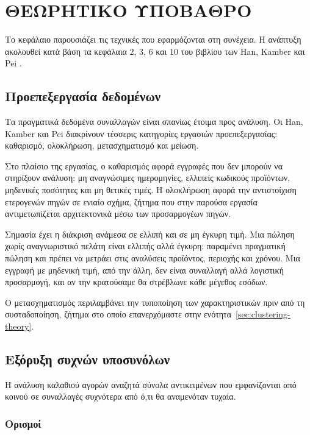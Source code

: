 \chapter{ΘΕΩΡΗΤΙΚΟ ΥΠΟΒΑΘΡΟ}
\label{chap:background}

Το κεφάλαιο παρουσιάζει τις τεχνικές που εφαρμόζονται στη συνέχεια. Η ανάπτυξη
ακολουθεί κατά βάση τα κεφάλαια 2, 3, 6 και 10 του βιβλίου των
Han, Kamber και Pei \cite{han2011data}.

\section{Προεπεξεργασία δεδομένων}

Τα πραγματικά δεδομένα συναλλαγών είναι σπανίως έτοιμα προς ανάλυση. Οι
Han, Kamber και Pei \cite{han2011data} διακρίνουν τέσσερις κατηγορίες εργασιών
προεπεξεργασίας: καθαρισμό, ολοκλήρωση, μετασχηματισμό και μείωση.

Στο πλαίσιο της εργασίας, ο καθαρισμός αφορά εγγραφές που δεν μπορούν να
στηρίξουν ανάλυση: μη αναγνώσιμες ημερομηνίες, ελλιπείς κωδικούς προϊόντων,
μηδενικές ποσότητες και μη θετικές τιμές. Η ολοκλήρωση αφορά την αντιστοίχιση
ετερογενών πηγών σε ενιαίο σχήμα, ζήτημα που στην παρούσα εργασία
αντιμετωπίζεται αρχιτεκτονικά μέσω των προσαρμογέων πηγών.

Σημασία έχει η διάκριση ανάμεσα σε ελλιπή και σε μη έγκυρη τιμή. Μια πώληση
χωρίς αναγνωριστικό πελάτη είναι ελλιπής αλλά έγκυρη: παραμένει πραγματική
πώληση και πρέπει να μετράει στις αναλύσεις προϊόντος, περιοχής και χρόνου. Μια
εγγραφή με μηδενική τιμή, από την άλλη, δεν είναι συναλλαγή αλλά λογιστική
προσαρμογή, και αν την κρατούσαμε θα στρέβλωνε κάθε μέγεθος εσόδων.

Ο μετασχηματισμός περιλαμβάνει την τυποποίηση των χαρακτηριστικών πριν από τη
συσταδοποίηση, ζήτημα στο οποίο επανερχόμαστε στην
ενότητα~\ref{sec:clustering-theory}.

\section{Εξόρυξη συχνών υποσυνόλων}

Η ανάλυση καλαθιού αγορών αναζητά σύνολα αντικειμένων που εμφανίζονται από
κοινού σε συναλλαγές συχνότερα από ό,τι θα αναμενόταν τυχαία.

\subsection{Ορισμοί}

